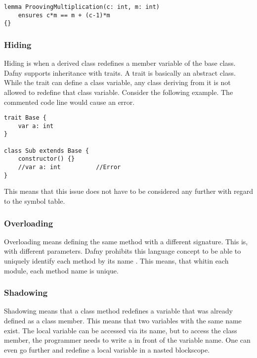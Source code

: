 \begin{lstlisting}[caption={Lemma}, captionpos=b, label={lst:lemma_example}]
lemma ProovingMultiplication(c: int, m: int)
    ensures c*m == m + (c-1)*m
{}
\end{lstlisting}

\subsubsection{Hiding}
Hiding is when a derived class redefines a member variable of the base class. Dafny supports inheritance with traits. A trait is basically an abstract class. While the trait can define a class variable, any class deriving from it is not allowed to redefine that class variable. Consider the following example. The commented code line would cause an error. \cite{dafnyReferenceManual}

\begin{lstlisting}[caption={Hiding}, captionpos=b, label={lst:hiding}]
trait Base {
    var a: int
}

class Sub extends Base {
    constructor() {}
    //var a: int          //Error
}
\end{lstlisting}

This means that this issue does not have to be considered any further with regard to the symbol table.

\subsubsection{Overloading}
Overloading means defining the same method with a different signature. This is, with different parameters. Dafny prohibits this language concept to be able to uniquely identify each method by its name \cite{dafnyReferenceManual}.
This means, that whitin each module, each method name is unique.

\subsubsection{Shadowing}

Shadowing means that a class method redefines a variable that was already defined as a class member. This means that two variables with the same name exist. The local variable can be accessed via its name, but to access the class member, the programmer needs to write a  in front of the variable name. One can even go further and redefine a local variable in a nasted blockscope.\\

